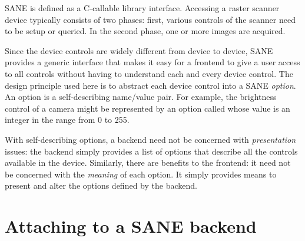 \documentclass[11pt,DVIps]{report}
\begin{document}
SANE is defined as a C-callable library interface.  Accessing a raster
scanner device typically consists of two phases: first, various
controls of the scanner need to be setup or queried.  In the second
phase, one or more images are acquired.

Since the device controls are widely different from device to device,
SANE provides a generic interface that makes it easy for a frontend to
give a user access to all controls without having to understand each
and every device control.  The design principle used here is to
abstract each device control into a SANE {\em option\/}.  An option is
a self-describing name/value pair.  For example, the brightness
control of a camera might be represented by an option called
 whose value is an integer in the range from 0 to
255.

With self-describing options, a backend need not be concerned with
{\em presentation\/} issues: the backend simply provides a list of
options that describe all the controls available in the device.
Similarly, there are benefits to the frontend: it need not be
concerned with the {\em meaning\/} of each option.  It simply provides
means to present and alter the options defined by the backend.


\section{Attaching to a SANE backend}
\end{document}
